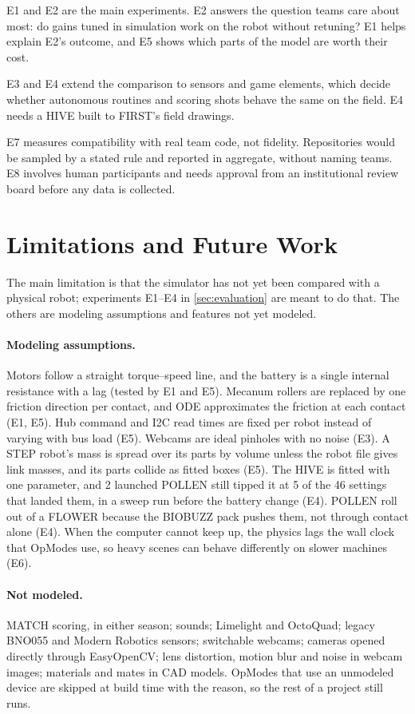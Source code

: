 \documentclass[10pt,twocolumn,letterpaper]{article}
\begin{document}
E1 and E2 are the main experiments. E2 answers the question teams care about most: do gains tuned in simulation work on the robot without retuning? E1 helps explain E2's outcome, and E5 shows which parts of the model are worth their cost.

E3 and E4 extend the comparison to sensors and game elements, which decide whether autonomous routines and scoring shots behave the same on the field. E4 needs a HIVE built to FIRST's field drawings.

E7 measures compatibility with real team code, not fidelity. Repositories would be sampled by a stated rule and reported in aggregate, without naming teams. E8 involves human participants and needs approval from an institutional review board before any data is collected.

\section{Limitations and Future Work}\label{sec:limitations}

The main limitation is that the simulator has not yet been compared with a physical robot; experiments E1–E4 in \cref{sec:evaluation} are meant to do that. The others are modeling assumptions and features not yet modeled.

\paragraph{Modeling assumptions.} Motors follow a straight torque–speed line, and the battery is a single internal resistance with a lag (tested by E1 and E5). Mecanum rollers are replaced by one friction direction per contact, and ODE approximates the friction at each contact (E1, E5). Hub command and I2C read times are fixed per robot instead of varying with bus load (E5). Webcams are ideal pinholes with no noise (E3). A STEP robot's mass is spread over its parts by volume unless the robot file gives link masses, and its parts collide as fitted boxes (E5). The HIVE is fitted with one parameter, and 2 launched POLLEN still tipped it at 5 of the 46 settings that landed them, in a sweep run before the battery change (E4). POLLEN roll out of a FLOWER because the BIOBUZZ pack pushes them, not through contact alone (E4). When the computer cannot keep up, the physics lags the wall clock that OpModes use, so heavy scenes can behave differently on slower machines (E6).

\paragraph{Not modeled.} MATCH scoring, in either season; sounds; Limelight and OctoQuad; legacy BNO055 and Modern Robotics sensors; switchable webcams; cameras opened directly through EasyOpenCV; lens distortion, motion blur and noise in webcam images; materials and mates in CAD models. OpModes that use an unmodeled device are skipped at build time with the reason, so the rest of a project still runs.
\end{document}
